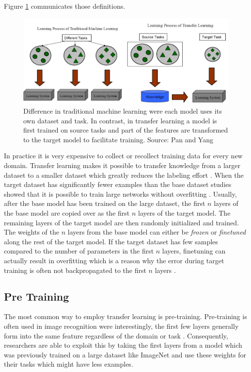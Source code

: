 Figure \ref{fig:03_transferLearning} communicates those definitions. 
\begin{figure}[ht]
	\centering
	\includegraphics[scale=0.55]{figures/03_theory/03_transferLearning}
	\caption{Difference in traditional machine learning were each model uses its own dataset and task. In contrast, in transfer learning a model is first trained on source tasks and part of the features are transformed to the target model to facilitate training. Source: Pan and Yang \cite{Pan2010}}
	\label{fig:03_transferLearning}
\end{figure}

In practice it is very expensive to collect or recollect training data for every new domain. Transfer learning makes it possible to transfer knowledge from a larger dataset to a smaller dataset which greatly reduces the labeling effort \cite{Blitzer2007}. When the target dataset has significantly fewer examples than the base dataset studies showed that it is possible to train large networks without overfitting \cite{Donahue2013}\cite{Zeiler2014}. Usually, after the base model has been trained on the large dataset, the first $n$ layers of the base model are copied over as the first $n$ layers of the target model. The remaining layers of the target model are then randomly initialized and trained. The weights of the $n$ layers from the base model can either be \textit{frozen} or \textit{finetuned} along the rest of the target model. If the target dataset has few samples compared to the number of parameters in the first $n$ layers, finetuning can actually result in overfitting which is a reason why the error during target training is often not backpropagated to the first $n$ layers \cite{Yosinski2014}.

\subsection*{Pre Training}
The most common way to employ transfer learning is pre-training. 
Pre-training is often used in image recognition were interestingly, the first few layers generally form into the same feature regardless of the domain or task \cite{Yosinski2014}. Consequently, researchers are able to exploit this by taking the first layers from a model which was previously trained on a large dataset like ImageNet \cite{Russakovsky2015} and use these weights for their tasks which might have less examples.

